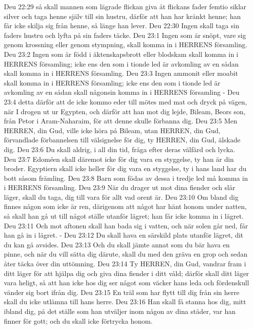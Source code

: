 Deu 22:29  så skall mannen som lägrade flickan giva åt flickans fader femtio siklar silver och taga henne själv till sin hustru, därför att han har kränkt henne; han får icke skilja sig från henne, så länge han lever.
Deu 22:30  Ingen skall taga sin faders hustru och lyfta på sin faders täcke.
Deu 23:1  Ingen som är snöpt, vare sig genom krossning eller genom stympning, skall komma in i HERRENS församling.
Deu 23:2  Ingen som är född i äktenskapsbrott eller blodskam skall komma in i HERRENS församling; icke ens den som i tionde led är avkomling av en sådan skall komma in i HERRENS församling.
Deu 23:3  Ingen ammonit eller moabit skall komma in i HERRENS församling; icke ens den som i tionde led är avkomling av en sådan skall någonsin komma in i HERRENS församling -
Deu 23:4  detta därför att de icke kommo eder till mötes med mat och dryck på vägen, när I drogen ut ur Egypten, och därför att han mot dig lejde, Bileam, Beors son, från Petor i Aram-Naharaim, för att denne skulle förbanna dig.
Deu 23:5  Men HERREN, din Gud, ville icke höra på Bileam, utan HERREN, din Gud, förvandlade förbannelsen till välsignelse för dig, ty HERREN, din Gud, älskade dig.
Deu 23:6  Du skall aldrig, i all din tid, fråga efter deras välfärd och lycka.
Deu 23:7  Edoméen skall däremot icke för dig vara en styggelse, ty han är din broder. Egyptiern skall icke heller för dig vara en styggelse, ty i hans land har du bott såsom främling.
Deu 23:8  Barn som födas av dessa i tredje led må komma in i HERRENS församling.
Deu 23:9  När du drager ut mot dina fiender och slår läger, skall du taga, dig till vara för allt vad orent är.
Deu 23:10  Om bland dig finnes någon som icke är ren, därigenom att något har hänt honom under natten, så skall han gå ut till något ställe utanför lägret; han får icke komma in i lägret.
Deu 23:11  Och mot aftonen skall han bada sig i vatten, och när solen går ned, får han gå in i lägret. -
Deu 23:12  Du skall hava en särskild plats utanför lägret, dit du kan gå avsides.
Deu 23:13  Och du skall jämte annat som du bär hava en pinne, och när du vill sätta dig därute, skall du med den gräva en grop och sedan åter täcka över din uttömning.
Deu 23:14  Ty HERREN, din Gud, vandrar fram i ditt läger för att hjälpa dig och giva dina fiender i ditt våld; därför skall ditt läger vara heligt, så att han icke hos dig ser något som väcker hans leda och fördenskull vänder sig bort ifrån dig.
Deu 23:15  En träl som har flytt till dig från sin herre skall du icke utlämna till hans herre.
Deu 23:16  Han skall få stanna hos dig, mitt ibland dig, på det ställe som han utväljer inom någon av dina städer, var han finner för gott; och du skall icke förtrycka honom.
